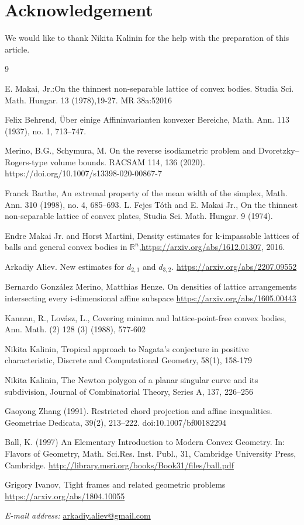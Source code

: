 \documentclass[12pt]{article}
\begin{document}
\section*{Acknowledgement}
\noindent We would like to thank Nikita Kalinin for the help with the preparation of this article.

\begin{thebibliography}{9}

E. Makai, Jr.:On the thinnest non-separable lattice of convex bodies. Studia Sci. Math. Hungar. 13 (1978),19-27. MR 38a:52016


    Felix Behrend, Über einige Affininvarianten konvexer Bereiche, Math. Ann. 113
(1937), no. 1, 713–747.

   
 Merino, B.G., Schymura, M. On the reverse isodiametric problem and Dvoretzky–Rogers-type volume bounds. RACSAM 114, 136 (2020). https://doi.org/10.1007/s13398-020-00867-7


 Franck Barthe, An extremal property of the mean width of the simplex, Math. Ann.
310 (1998), no. 4, 685–693.
     L. Fejes T\'oth and E. Makai Jr., On the thinnest non-separable lattice of convex plates, Studia Sci. Math. Hungar. 9 (1974).

      Endre Makai Jr. and Horst Martini, Density estimates for k-impassable lattices of balls and general convex bodies in $\mathbb{R}^n$,\url{https://arxiv.org/abs/1612.01307}, 2016.

   Arkadiy Aliev. New estimates for $d_{2,1}$ and $d_{3,2}$. \url{https://arxiv.org/abs/2207.09552}

  

   Bernardo González Merino, Matthias Henze. On densities of lattice arrangements intersecting every i-dimensional affine subspace \url{https://arxiv.org/abs/1605.00443}

Kannan, R., Lov\'asz, L., Covering minima and lattice-point-free convex
bodies, Ann. Math. (2) 128 (3) (1988), 577-602
  
   Nikita Kalinin, Tropical approach to Nagata’s conjecture in positive characteristic, Discrete and Computational Geometry, 58(1), 158-179

   Nikita Kalinin, The Newton polygon of a planar singular curve and its subdivision, Journal of
Combinatorial Theory, Series A, 137, 226–256


  Gaoyong Zhang (1991). Restricted chord projection and affine inequalities. Geometriae Dedicata, 39(2), 213–222. doi:10.1007/bf00182294 

    
     Ball, K. (1997) An Elementary Introduction to Modern Convex Geometry. In: Flavors of Geometry, Math. Sci.Res. Inst. Publ., 31, Cambridge University Press, Cambridge. \url{http://library.msri.org/books/Book31/files/ball.pdf}
    
     Grigory Ivanov, Tight frames and related geometric problems \url{https://arxiv.org/abs/1804.10055}
\end{thebibliography}

\textit{E-mail address:} \href{mailto:arkadiy.aliev@gmail.com}{arkadiy.aliev@gmail.com} 
\end{document}
